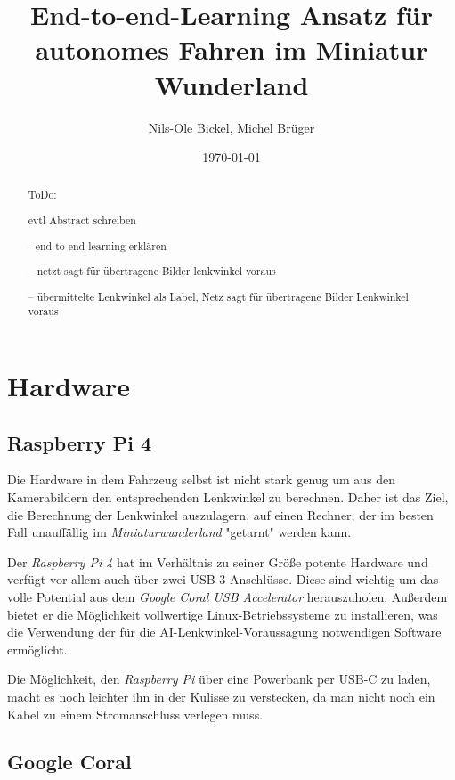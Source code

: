 \documentclass[a4paper, 12pt]{scrartcl}
\title{End-to-end-Learning Ansatz für autonomes Fahren im Miniatur Wunderland}
\author{Nils-Ole Bickel, Michel Brüger}
\date{\today}
\begin{document}
	
\maketitle
	
\tableofcontents

\newpage
	
	\begin{abstract}
ToDo: 

evtl Abstract schreiben	

- end-to-end learning erklären

-- netzt sagt für übertragene Bilder lenkwinkel voraus

-- übermittelte Lenkwinkel als Label, Netz sagt für übertragene Bilder Lenkwinkel voraus
	\end{abstract}

	\section{Hardware}
		\subsection{Raspberry Pi 4}
		Die Hardware in dem Fahrzeug selbst ist nicht stark genug um aus den Kamerabildern den entsprechenden Lenkwinkel zu berechnen. Daher ist das Ziel, die Berechnung der Lenkwinkel auszulagern, auf einen Rechner, der im besten Fall unauffällig im \emph{Miniaturwunderland} "getarnt" werden kann. 
		
		Der \emph{Raspberry Pi 4} hat im Verhältnis zu seiner Größe potente Hardware und verfügt vor allem auch über zwei USB-3-Anschlüsse. Diese sind wichtig um das volle Potential aus dem \emph{Google Coral USB Accelerator} herauszuholen. Außerdem bietet er die Möglichkeit vollwertige Linux-Betriebssysteme zu installieren, was die Verwendung der für die AI-Lenkwinkel-Voraussagung notwendigen Software ermöglicht.
		
		Die Möglichkeit, den \emph{Raspberry Pi} über eine Powerbank per USB-C zu laden, macht es noch leichter ihn in der Kulisse zu verstecken, da man nicht noch ein Kabel zu einem Stromanschluss verlegen muss.
		
		
		\subsection{Google Coral}
		
\end{document}
